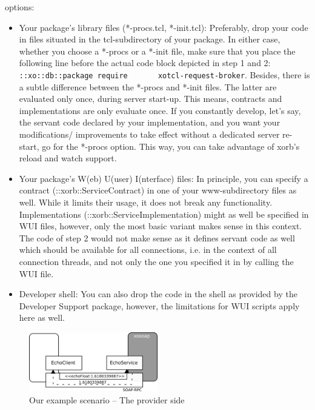 \begin{enumerate}
    options:
    \begin{itemize}
    \item Your package's library files (*-procs.tcl, *-init.tcl):
      Preferably, drop your code in files situated in the tcl-subdirectory
      of your package. In either case, whether you choose a *-procs or a
      *-init file, make sure that you place the following line before the
      actual code block depicted in step 1 and 2:
      \lstinline[breaklines=true]!::xo::db::package require
      xotcl-request-broker!. Besides, there is a subtle difference between
      the *-procs and *-init files. The latter are evaluated only once,
      during server start-up. This means, contracts and implementations are
      only evaluate once. If you constantly develop, let's say, the servant
      code declared by your implementation, and you want your modifications/
      improvements to take effect without a dedicated server re-start, go
      for the *-procs option. This way, you can take advantage of xorb's
      reload and watch support.
    \item Your package's W(eb) U(user) I(nterface) files: In principle,
      you can specify a contract (::xorb::ServiceContract) in one of your
      www-subdirectory files as well. While it limits their usage, it does
      not break any functionality. Implementations
      (::xorb::ServiceImplementation) might as well be specified in WUI
      files, however, only the most basic variant makes sense in this
      context. The code of step 2 would not make sense as it defines servant
      code as well which should be available for all connections, i.e. in
      the context of all connection threads, and not only the one you
      specified it in by calling the WUI file.
    \item Developer shell: You can also drop the code in the shell as
      provided by the Developer Support package, however, the limitations
      for WUI scripts apply here as well.
    \end{itemize}
    
  \end{enumerate}
  \begin{figure}[htbp]
    \begin{center}
      \includegraphics[width=0.5\textwidth]{img/provider.png}
      \caption{Our example scenario -- The provider side}
      \label{fig:quickstart:xosoap:2}
    \end{center}
  \end{figure}
  
